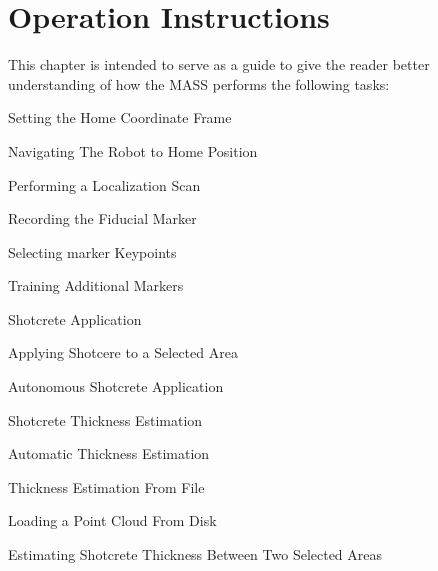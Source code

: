 \chapter{Operation Instructions}
\label{chap:manual}
This chapter is intended to serve as a guide to give the reader better understanding of how the MASS performs the following tasks:
\begin{myitemize}
\item Setting the Home Coordinate Frame
\begin{myitemize}
\item Navigating The Robot to Home Position
\item Performing a Localization Scan
\end{myitemize}
\item Recording the Fiducial Marker
\begin{myitemize}
\item Selecting marker Keypoints
\item Training Additional Markers
\end{myitemize}
\item Shotcrete Application
\begin{myitemize}
\item Applying Shotcere to a Selected Area
\item Autonomous Shotcrete Application
\end{myitemize}
\item Shotcrete Thickness Estimation
\begin{myitemize}
\item Automatic Thickness Estimation
\item Thickness Estimation From File
\item Loading a Point Cloud From Disk
\item Estimating Shotcrete Thickness Between Two Selected Areas
\end{myitemize}
\end{myitemize}
\newpage
